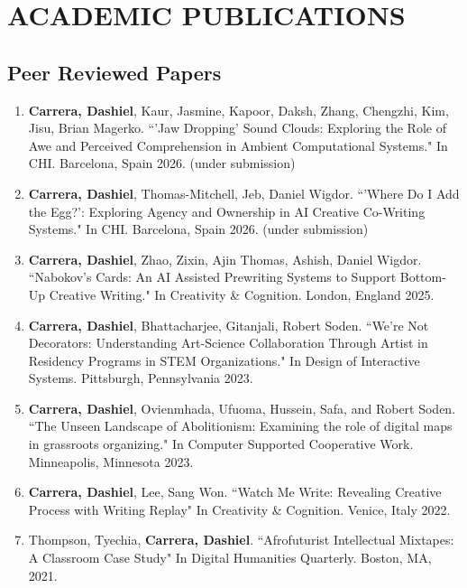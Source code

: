\section{ACADEMIC PUBLICATIONS}

\subsection{Peer Reviewed Papers}
 \begin{enumerate}
  
 
 
 
   \item \textbf{Carrera, Dashiel}, Kaur, Jasmine, Kapoor, Daksh, Zhang, Chengzhi, Kim, Jisu, Brian Magerko. ``'Jaw Dropping' Sound Clouds: Exploring the Role of Awe and Perceived Comprehension in Ambient Computational Systems." In CHI. Barcelona, Spain 2026. (under submission) \\
 
  \item \textbf{Carrera, Dashiel}, Thomas-Mitchell, Jeb, Daniel Wigdor. ``'Where Do I Add the Egg?': Exploring Agency and Ownership in AI Creative Co-Writing Systems." In CHI. Barcelona, Spain 2026. (under submission) \\
  
   
  \item \textbf{Carrera, Dashiel}, Zhao, Zixin, Ajin Thomas, Ashish, Daniel Wigdor. ``Nabokov's Cards: An AI Assisted Prewriting Systems to Support Bottom-Up Creative Writing." In Creativity \& Cognition. London, England 2025. \\
  \item \textbf{Carrera, Dashiel}, Bhattacharjee, Gitanjali, Robert Soden. ``We're Not Decorators: Understanding Art-Science Collaboration Through Artist in Residency Programs in STEM Organizations." In Design of Interactive Systems. Pittsburgh, Pennsylvania 2023. \\
  \item \textbf{Carrera, Dashiel}, Ovienmhada, Ufuoma, Hussein, Safa, and Robert Soden. ``The Unseen Landscape of Abolitionism: Examining the role of digital maps in
grassroots organizing."  In Computer Supported Cooperative Work. Minneapolis, Minnesota 2023.\\
  \item \textbf{Carrera, Dashiel}, Lee, Sang Won. ``Watch Me Write: Revealing Creative Process with Writing Replay" In Creativity \& Cognition. Venice, Italy 2022. \\
  \item Thompson, Tyechia, \textbf{Carrera, Dashiel}. ``Afrofuturist Intellectual Mixtapes: A Classroom Case Study" In Digital Humanities Quarterly. Boston, MA, 2021.\
 \end{enumerate}

